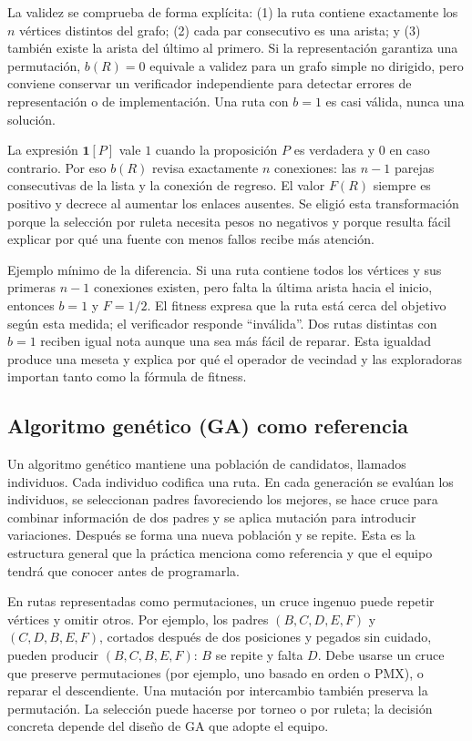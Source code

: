 La validez se comprueba de forma explícita: (1) la ruta contiene exactamente los $n$ vértices distintos del grafo; (2) cada par consecutivo es una arista; y (3) también existe la arista del último al primero. Si la representación garantiza una permutación, $b(R)=0$ equivale a validez para un grafo simple no dirigido, pero conviene conservar un verificador independiente para detectar errores de representación o de implementación. Una ruta con $b=1$ es casi válida, nunca una solución.

La expresión $\mathbf{1}[P]$ vale $1$ cuando la proposición $P$ es verdadera y $0$ en caso contrario. Por eso $b(R)$ revisa exactamente $n$ conexiones: las $n-1$ parejas consecutivas de la lista y la conexión de regreso. El valor $F(R)$ siempre es positivo y decrece al aumentar los enlaces ausentes. Se eligió esta transformación porque la selección por ruleta necesita pesos no negativos y porque resulta fácil explicar por qué una fuente con menos fallos recibe más atención.\cite{abc8}

Ejemplo mínimo de la diferencia. Si una ruta contiene todos los vértices y sus primeras $n-1$ conexiones existen, pero falta la última arista hacia el inicio, entonces $b=1$ y $F=1/2$. El fitness expresa que la ruta está cerca del objetivo según esta medida; el verificador responde ``inválida''. Dos rutas distintas con $b=1$ reciben igual nota aunque una sea más fácil de reparar. Esta igualdad produce una meseta y explica por qué el operador de vecindad y las exploradoras importan tanto como la fórmula de fitness.

\subsection{Algoritmo genético (GA) como referencia}
Un algoritmo genético mantiene una población de candidatos, llamados individuos. Cada individuo codifica una ruta. En cada generación se evalúan los individuos, se seleccionan padres favoreciendo los mejores, se hace cruce para combinar información de dos padres y se aplica mutación para introducir variaciones. Después se forma una nueva población y se repite. Esta es la estructura general que la práctica menciona como referencia y que el equipo tendrá que conocer antes de programarla.\cite{abc4,abc5}

En rutas representadas como permutaciones, un cruce ingenuo puede repetir vértices y omitir otros. Por ejemplo, los padres $(B,C,D,E,F)$ y $(C,D,B,E,F)$, cortados después de dos posiciones y pegados sin cuidado, pueden producir $(B,C,B,E,F)$: $B$ se repite y falta $D$. Debe usarse un cruce que preserve permutaciones (por ejemplo, uno basado en orden o PMX), o reparar el descendiente.\cite{abc6} Una mutación por intercambio también preserva la permutación. La selección puede hacerse por torneo o por ruleta; la decisión concreta depende del diseño de GA que adopte el equipo.


